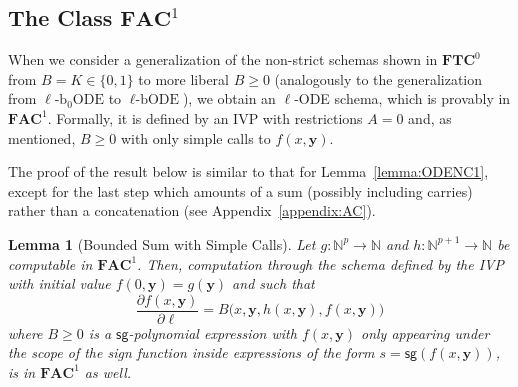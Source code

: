 \documentclass[11pt, oneside]{article}
\newcommand{\fun}[1]{\mathsf{#1}}
\newcommand{\Nat}{\mathbb{N}}
\newcommand{\AC}{\mathbf{FAC}}
\newcommand{\TC}{\mathbf{FTC}}
\newcommand{\tu}[1]{\mathbf{#1}}
\newtheorem{lemma}{Lemma}
\theoremstyle{definition}
\newcommand{\schODE}{\ell\text{-b}_0\text{ODE}}
\newcommand{\chODE}{\ell\text{-bODE}}
\begin{document}
\subsection{The Class $\AC^1$}\label{sec:ACone}

When we consider a generalization of the non-strict schemas shown in $\TC^0$ from $B=K\in \{0,1\}$ to more liberal $B\ge 0$ (analogously to the generalization from $\schODE$ to $\chODE$), we obtain an $\ell$-ODE schema, which is provably in $\AC^1$.
%
Formally, it is defined by an IVP
with restrictions 
$A=0$ and, as mentioned, $B\ge 0$ with only simple calls to $f(x, \tu y)$.


The proof of the result below is similar  to that for Lemma~\ref{lemma:ODENC1}, except for the last step which amounts of a sum (possibly including carries) rather than a concatenation (see Appendix~\ref{appendix:AC}).

\begin{lemma}[Bounded Sum with Simple Calls]\label{lemma:AC1}
    Let $g: \Nat^p \to \Nat$ and $h:\Nat^{p+1}\to \Nat$ be computable in $\AC^1$. Then, computation through the schema defined by the IVP with initial value $f(0, \tu y)=g(\tu y)$ and such that
    $$
    \frac{\partial f(x, \tu y)}{\partial \ell} = B\big(x, \tu y, h(x, \tu y), f(x, \tu y)\big)
    $$
    where $B \ge 0$ is a $\fun{sg}$-polynomial expression with $f(x,\tu y)$ only appearing under the scope of the sign function inside expressions of the form $s=\fun{sg}(f(x, \tu y))$, is in $\AC^1$ as well.
\end{lemma}
\end{document}
